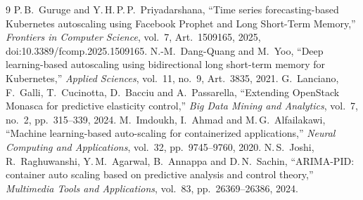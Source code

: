 \documentclass[11pt,a4paper]{article}
\begin{document}
\begin{thebibliography}{9}\small
{} P.\,B.\ Guruge and Y.\,H.\,P.\,P.\ Priyadarshana, ``Time series forecasting-based Kubernetes autoscaling using Facebook Prophet and Long Short-Term Memory,'' \textit{Frontiers in Computer Science}, vol.\ 7, Art.\ 1509165, 2025, doi:10.3389/fcomp.2025.1509165.
 N.-M.\ Dang-Quang and M.\ Yoo, ``Deep learning-based autoscaling using bidirectional long short-term memory for Kubernetes,'' \textit{Applied Sciences}, vol.\ 11, no.\ 9, Art.\ 3835, 2021.
 G.\ Lanciano, F.\ Galli, T.\ Cucinotta, D.\ Bacciu and A.\ Passarella, ``Extending OpenStack Monasca for predictive elasticity control,'' \textit{Big Data Mining and Analytics}, vol.\ 7, no.\ 2, pp.\ 315--339, 2024.
 M.\ Imdoukh, I.\ Ahmad and M.\,G.\ Alfailakawi, ``Machine learning-based auto-scaling for containerized applications,'' \textit{Neural Computing and Applications}, vol.\ 32, pp.\ 9745--9760, 2020.
 N.\,S.\ Joshi, R.\ Raghuwanshi, Y.\,M.\ Agarwal, B.\ Annappa and D.\,N.\ Sachin, ``ARIMA-PID: container auto scaling based on predictive analysis and control theory,'' \textit{Multimedia Tools and Applications}, vol.\ 83, pp.\ 26369--26386, 2024.
\end{thebibliography}
\end{document}
